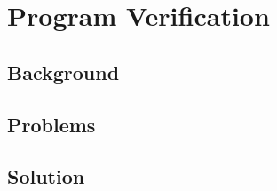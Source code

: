 \chapter{\;\;\;\;Program Verification}
\label{sec:program}

\section{Background}
\label{sec:program:background}

\section{Problems}
\label{sec:program:problems}

\section{Solution}
\label{sec:program:solution}
